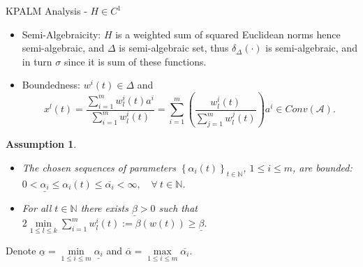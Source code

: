 \documentclass[9pt]{beamer}
\newtheorem{assumption}{Assumption}
\newcommand{\nn}{\mathbb{N}} %
\begin{document}
	\begin{frame}{KPALM Analysis - $H \in C^1$}
		\begin{itemize}[<+->]
			\item Semi-Algebraicity: $H$ is a weighted sum of squared Euclidean norms hence semi-algebraic, and $\Delta$ is semi-algebraic set, thus $\delta_{\Delta}(\cdot)$ is semi-algebraic, and in turn $\sigma$ since it is sum of these functions.
			\item Boundedness: $w^i(t) \in \Delta$ and 
				\begin{equation*}
					x^l(t) = \frac{\sum_{i=1}^{m} w^i_l(t) a^i}{\sum_{i=1}^{m} w^i_l(t)} 
					= \sum_{i=1}^{m} \left( \frac{ w^i_l(t)}{\sum_{j=1}^{m} w^j_l(t)} \right) a^i \in Conv(\mathcal{A}).
				\end{equation*}
		\end{itemize}
		\pause
		\begin{assumption} \label{AssumptionsB}
            \begin{itemize}
                \item[$\rm{(i)}$] The chosen sequences of parameters $\left\{ \alpha_i(t) \right\}_{t \in \nn}$, $1 \leq i \leq m$, are bounded: $0 < \underline{\alpha_i} \leq \alpha_i(t) \leq \overline{\alpha_i} < \infty, \quad \forall \: t \in \nn$.
                \item[$\rm{(ii)}$] For all $t \in \mathbb{N}$ there exists $\underline{\beta} > 0$ such that $2\min\limits_{1 \leq l \leq k} \sum\limits_{i=1}^{m} w^i_l(t) := \beta(w(t)) \geq \underline{\beta}$.
            \end{itemize}
        \end{assumption}
        \pause
        Denote $\underline{\alpha}=\min\limits_{1 \leq i \leq m} \underline{\alpha_i}$ and $\overline{\alpha}=\max\limits_{1 \leq i \leq m} \overline{\alpha_i}$.
	\end{frame}
	
\end{document}
